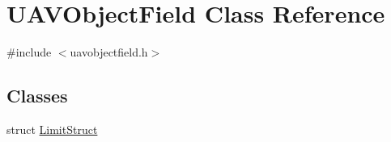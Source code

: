 \hypertarget{class_u_a_v_object_field}{\section{\-U\-A\-V\-Object\-Field \-Class \-Reference}
\label{class_u_a_v_object_field}
}


{\ttfamily \#include $<$uavobjectfield.\-h$>$}

\subsection*{\-Classes}
\begin{DoxyCompactItemize}
\item 
struct \hyperlink{struct_u_a_v_object_field_1_1_limit_struct}{\-Limit\-Struct}
\end{DoxyCompactItemize}

